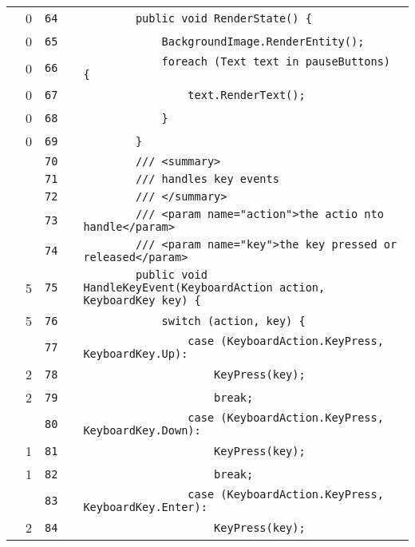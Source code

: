 \documentclass[a4paper,landscape,10pt]{article}
\begin{document}
\begin{longtable}[l]{lrrll}
\cellcolor{red} & 0 & \verb~64~ & & \verb~        public void RenderState() {~\\
\cellcolor{red} & 0 & \verb~65~ & & \verb~            BackgroundImage.RenderEntity();~\\
\cellcolor{red} & 0 & \verb~66~ & & \verb~            foreach (Text text in pauseButtons) {~\\
\cellcolor{red} & 0 & \verb~67~ & & \verb~                text.RenderText();~\\
\cellcolor{red} & 0 & \verb~68~ & & \verb~            }~\\
\cellcolor{red} & 0 & \verb~69~ & & \verb~        }~\\
\cellcolor{gray} &  & \verb~70~ & & \verb~        /// <summary>~\\
\cellcolor{gray} &  & \verb~71~ & & \verb~        /// handles key events~\\
\cellcolor{gray} &  & \verb~72~ & & \verb~        /// </summary>~\\
\cellcolor{gray} &  & \verb~73~ & & \verb~        /// <param name="action">the actio nto handle</param>~\\
\cellcolor{gray} &  & \verb~74~ & & \verb~        /// <param name="key">the key pressed or released</param>~\\
\cellcolor{green} & 5 & \verb~75~ & & \verb~        public void HandleKeyEvent(KeyboardAction action, KeyboardKey key) {~\\
\cellcolor{green} & 5 & \verb~76~ & & \verb~            switch (action, key) {~\\
\cellcolor{gray} &  & \verb~77~ & & \verb~                case (KeyboardAction.KeyPress, KeyboardKey.Up):~\\
\cellcolor{green} & 2 & \verb~78~ & & \verb~                    KeyPress(key);~\\
\cellcolor{green} & 2 & \verb~79~ & & \verb~                    break;~\\
\cellcolor{gray} &  & \verb~80~ & & \verb~                case (KeyboardAction.KeyPress, KeyboardKey.Down):~\\
\cellcolor{green} & 1 & \verb~81~ & & \verb~                    KeyPress(key);~\\
\cellcolor{green} & 1 & \verb~82~ & & \verb~                    break;~\\
\cellcolor{gray} &  & \verb~83~ & & \verb~                case (KeyboardAction.KeyPress, KeyboardKey.Enter):~\\
\cellcolor{green} & 2 & \verb~84~ & & \verb~                    KeyPress(key);~\\

\end{longtable}
\end{document}
